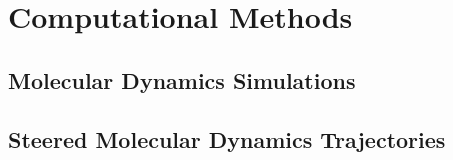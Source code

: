 \section{Computational Methods}

\subsection{Molecular Dynamics Simulations}

\subsection{Steered Molecular Dynamics Trajectories}


